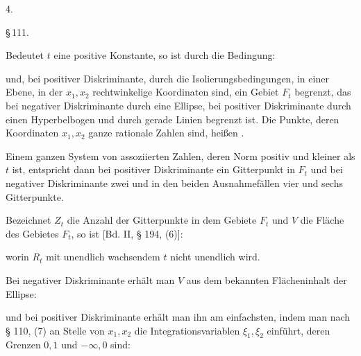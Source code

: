 
4. 



\begin{center}
\S\,111. 
\end{center}

Bedeutet $t$ eine positive Konstante, so ist durch die Bedingung:

und, bei positiver Diskriminante, durch die Isolierungsbedingungen,
in einer Ebene, in der $x_1, x_2$ rechtwinkelige Koordinaten sind,
ein Gebiet $F_t$ begrenzt, das bei negativer Diskriminante durch
eine Ellipse, bei positiver Diskriminante durch einen Hyperbelbogen
 und durch gerade Linien begrenzt ist. Die Punkte, deren
Koordinaten $x_1, x_2$ ganze rationale Zahlen sind, heißen .

Einem ganzen System von assoziierten Zahlen, deren Norm
positiv und kleiner als $t$ ist, entspricht dann bei positiver Diskriminante
 ein Gitterpunkt in $F_t$ und bei negativer Diskriminante
zwei und in den beiden Ausnahmefällen vier und sechs Gitterpunkte.

Bezeichnet $Z_t$ die Anzahl der Gitterpunkte in dem Gebiete
$F_t$ und $V$ die Fläche des Gebietes $F_t$, so ist [Bd. II, § 194, (6)]:

worin $R_t$ mit unendlich wachsendem $t$ nicht unendlich wird.

Bei negativer Diskriminante erhält man $V$ aus dem bekannten
Flächeninhalt der Ellipse:

und bei positiver Diskriminante erhält man ihn am einfachsten,
indem man nach § 110, (7) an Stelle von $x_1, x_2$ die Integrationsvariablen
 $\xi_1, \xi_2$ einführt, deren Grenzen $0, 1$ und $-\infty, 0$ sind:

